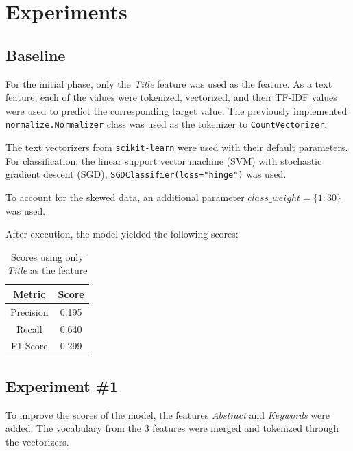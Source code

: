 \documentclass[11pt]{article}
\begin{document}
\section*{Experiments}

\subsection*{Baseline}
For the initial phase, only the \textit{Title} feature was used as the feature. As a text feature, each of the values were tokenized, vectorized, and their TF-IDF values were used to predict the corresponding target value. The previously implemented \texttt{normalize.Normalizer} class was used as the tokenizer to \texttt{CountVectorizer}.

The text vectorizers from \texttt{scikit-learn} were used with their default parameters. For classification, the linear support vector machine (SVM) with stochastic gradient descent (SGD), \texttt{SGDClassifier(loss="hinge")} was used.

To account for the skewed data, an additional parameter $class\_weight=\{1:30\}$ was used.

After execution, the model yielded the following scores:
\begin{table}[!ht]
    \caption{Scores using only \textit{Title} as the feature}
    \begin{center}

        \begin{tabular}{| c | c |}
        \hline
        \textbf{Metric} & \textbf{Score}
        \\ \hline
        Precision & 0.195 
        \\ \hline
        Recall & 0.640
        \\ \hline
        F1-Score & 0.299
        \\ \hline
        \end{tabular}

    \end{center}

\end{table}

\subsection*{Experiment \#1}
To improve the scores of the model, the features \textit{Abstract} and \textit{Keywords} were added. The vocabulary from the 3 features were merged and tokenized through the vectorizers. 
\end{document}
